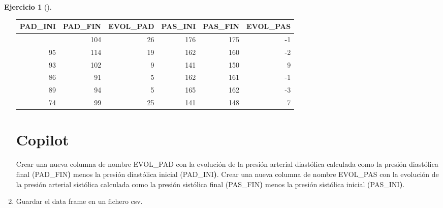 \documentclass[
  a4paper,
]{scrreport}
\newenvironment{Shaded}{\begin{snugshade}}{\end{snugshade}}
\newcommand{\BuiltInTok}[1]{\textcolor[rgb]{0.00,0.23,0.31}{#1}}
\newcommand{\ErrorTok}[1]{\textcolor[rgb]{0.68,0.00,0.00}{#1}}
\newcommand{\ExtensionTok}[1]{\textcolor[rgb]{0.00,0.23,0.31}{#1}}
\newcommand{\KeywordTok}[1]{\textcolor[rgb]{0.00,0.23,0.31}{\textbf{#1}}}
\newcommand{\NormalTok}[1]{\textcolor[rgb]{0.00,0.23,0.31}{#1}}
\theoremstyle{definition}
\newtheorem{exercise}{Ejercicio}[chapter]
\theoremstyle{remark}
\begin{document}
\begin{exercise}[]
\begin{enumerate}
\begin{tcolorbox}
  \begin{longtable}[]{@{}rrrrrr@{}}
  \toprule\noalign{}
  PAD\_INI & PAD\_FIN & EVOL\_PAD & PAS\_INI & PAS\_FIN & EVOL\_PAS \\
  \midrule\noalign{}
  \endhead
  \bottomrule\noalign{}
  \endlastfoot
  78 & 104 & 26 & 176 & 175 & -1 \\
  95 & 114 & 19 & 162 & 160 & -2 \\
  93 & 102 & 9 & 141 & 150 & 9 \\
  86 & 91 & 5 & 162 & 161 & -1 \\
  89 & 94 & 5 & 165 & 162 & -3 \\
  74 & 99 & 25 & 141 & 148 & 7 \\
  \end{longtable}

  \section{Copilot}

\begin{Shaded}
\begin{Highlighting}[]
\ExtensionTok{Crear}\NormalTok{ una nueva columna de nombre EVOL\_PAD con la evolución de la presión arterial diastólica calculada como la presión diastólica final }\ErrorTok{(}\ExtensionTok{PAD\_FIN}\KeywordTok{)} \ExtensionTok{menos}\NormalTok{ la presión diastólica inicial }\ErrorTok{(}\ExtensionTok{PAD\_INI}\KeywordTok{)}\BuiltInTok{.}\NormalTok{ Crear una nueva columna de nombre EVOL\_PAS con la evolución de la presión arterial sistólica calculada como la presión sistólica final }\ErrorTok{(}\ExtensionTok{PAS\_FIN}\KeywordTok{)} \ExtensionTok{menos}\NormalTok{ la presión sistólica inicial }\ErrorTok{(}\ExtensionTok{PAS\_INI}\KeywordTok{)}\BuiltInTok{.}
\end{Highlighting}
\end{Shaded}

  \end{tcolorbox}
\item
  Guardar el data frame en un fichero csv.

  \begin{tcolorbox}[enhanced jigsaw, colframe=quarto-callout-tip-color-frame, toprule=.15mm, bottomtitle=1mm, breakable, opacitybacktitle=0.6, toptitle=1mm, colback=white, bottomrule=.15mm, title=\textcolor{quarto-callout-tip-color}{\faLightbulb}\hspace{0.5em}{Solución}, arc=.35mm, left=2mm, titlerule=0mm, rightrule=.15mm, coltitle=black, leftrule=.75mm, opacityback=0, colbacktitle=quarto-callout-tip-color!10!white]


\end{tcolorbox}
\end{enumerate}
\end{exercise}
\end{document}
